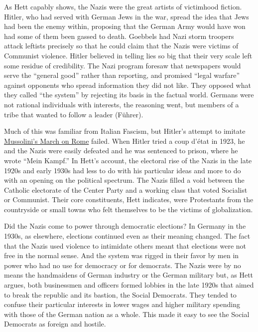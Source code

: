 As Hett capably shows, the Nazis were the great artists of victimhood
fiction. Hitler, who had served with German Jews in the war, spread the
idea that Jews had been the enemy within, proposing that the German Army
would have won had some of them been gassed to death. Goebbels had Nazi
storm troopers attack leftists precisely so that he could claim that the
Nazis were victims of Communist violence. Hitler believed in telling
lies so big that their very scale left some residue of credibility. The
Nazi program foresaw that newspapers would serve the ``general good''
rather than reporting, and promised ``legal warfare'' against opponents
who spread information they did not like. They opposed what they called
``the system'' by rejecting its basis in the factual world. Germans were
not rational individuals with interests, the reasoning went, but members
of a tribe that wanted to follow a leader (Führer).

Much of this was familiar from Italian Fascism, but Hitler's attempt to
imitate
\href{http://warfarehistorynetwork.com/daily/benito-mussolini-the-fascist-march-on-rome/}{Mussolini's
March on Rome} failed. When Hitler tried a coup d'état in 1923, he and
the Nazis were easily defeated and he was sentenced to prison, where he
wrote ``Mein Kampf.'' In Hett's account, the electoral rise of the Nazis
in the late 1920s and early 1930s had less to do with his particular
ideas and more to do with an opening on the political spectrum. The
Nazis filled a void between the Catholic electorate of the Center Party
and a working class that voted Socialist or Communist. Their core
constituents, Hett indicates, were Protestants from the countryside or
small towns who felt themselves to be the victims of globalization.

Did the Nazis come to power through democratic elections? In Germany in
the 1930s, as elsewhere, elections continued even as their meaning
changed. The fact that the Nazis used violence to intimidate others
meant that elections were not free in the normal sense. And the system
was rigged in their favor by men in power who had no use for democracy
or for democrats. The Nazis were by no means the handmaidens of German
industry or the German military but, as Hett argues, both businessmen
and officers formed lobbies in the late 1920s that aimed to break the
republic and its bastion, the Social Democrats. They tended to confuse
their particular interests in lower wages and higher military spending
with those of the German nation as a whole. This made it easy to see the
Social Democrats as foreign and hostile.

